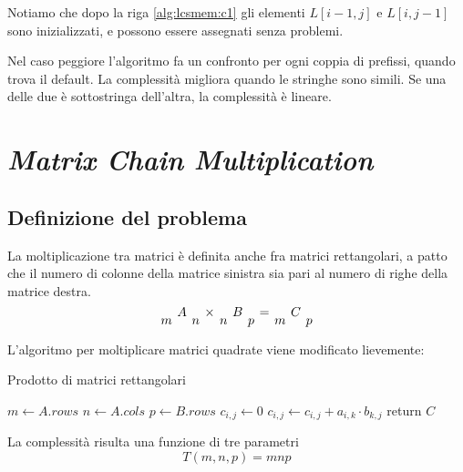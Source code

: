 Notiamo che dopo la riga \ref{alg:lcsmem:c1} gli elementi $L[i-1,j]$ e $L[i,j-1]$ sono inizializzati, e possono essere assegnati senza problemi.

Nel caso peggiore l'algoritmo fa un confronto per ogni coppia di prefissi, quando trova il default. La complessità migliora quando le stringhe sono simili. Se una delle due è sottostringa dell'altra, la complessità è lineare.


\section{\emph{Matrix Chain Multiplication}}

\subsection{Definizione del problema}

La moltiplicazione tra matrici è definita anche fra matrici rettangolari, a patto che il numero di colonne della matrice sinistra sia pari al numero di righe della matrice destra.
\begin{equation*}
\begingroup
\setlength{\arraycolsep}{2pt} %
\renewcommand{\arraystretch}{0.5} %
    \begin{array}[h]{ccccccccccc}
          & A &   & \times &   & B &   & = &   & C & \\%
        m &   & n &        & n &   & p &   & m &   & p
    \end{array}
\endgroup
\end{equation*}

L'algoritmo per moltiplicare matrici quadrate viene modificato lievemente:
\begin{algorithm}[H]
\caption{Prodotto di matrici rettangolari}\label{alg:mulret}
\begin{algorithmic}[1]
    \State $m \gets A.rows$
    \State $n \gets A.cols$
    \State $p \gets B.rows$
            \State $c_{i,j} \gets 0$
                \State $c_{i,j} \gets c_{i,j} + a_{i,k} \cdot b_{k,j} $
            \EndFor
        \EndFor
    \EndFor
    \State return $C$
\EndProcedure
\end{algorithmic}
\end{algorithm}
La complessità risulta una funzione di tre parametri
\begin{equation*}
    T\left( m,n,p \right) = mnp
\end{equation*}

